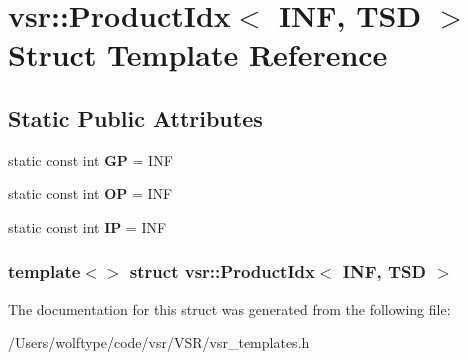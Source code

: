 \hypertarget{structvsr_1_1_product_idx_3_01_i_n_f_00_01_t_s_d_01_4}{\section{vsr\-:\-:Product\-Idx$<$ I\-N\-F, T\-S\-D $>$ Struct Template Reference}
\label{structvsr_1_1_product_idx_3_01_i_n_f_00_01_t_s_d_01_4}
}
\subsection*{Static Public Attributes}
\begin{DoxyCompactItemize}
\item 
\hypertarget{structvsr_1_1_product_idx_3_01_i_n_f_00_01_t_s_d_01_4_ad6d66dc5376afd2b950aad2e930d07f7}{static const int {\bfseries G\-P} = I\-N\-F}\label{structvsr_1_1_product_idx_3_01_i_n_f_00_01_t_s_d_01_4_ad6d66dc5376afd2b950aad2e930d07f7}

\item 
\hypertarget{structvsr_1_1_product_idx_3_01_i_n_f_00_01_t_s_d_01_4_a7d560b2c3c312e8a282e72b1a13c877e}{static const int {\bfseries O\-P} = I\-N\-F}\label{structvsr_1_1_product_idx_3_01_i_n_f_00_01_t_s_d_01_4_a7d560b2c3c312e8a282e72b1a13c877e}

\item 
\hypertarget{structvsr_1_1_product_idx_3_01_i_n_f_00_01_t_s_d_01_4_ad769d8d2b3e9220c3d5a16219d3cbffe}{static const int {\bfseries I\-P} = I\-N\-F}\label{structvsr_1_1_product_idx_3_01_i_n_f_00_01_t_s_d_01_4_ad769d8d2b3e9220c3d5a16219d3cbffe}

\end{DoxyCompactItemize}
\subsubsection*{template$<$$>$ struct vsr\-::\-Product\-Idx$<$ I\-N\-F, T\-S\-D $>$}



The documentation for this struct was generated from the following file\-:\begin{DoxyCompactItemize}
\item 
/\-Users/wolftype/code/vsr/\-V\-S\-R/vsr\-\_\-templates.\-h\end{DoxyCompactItemize}
